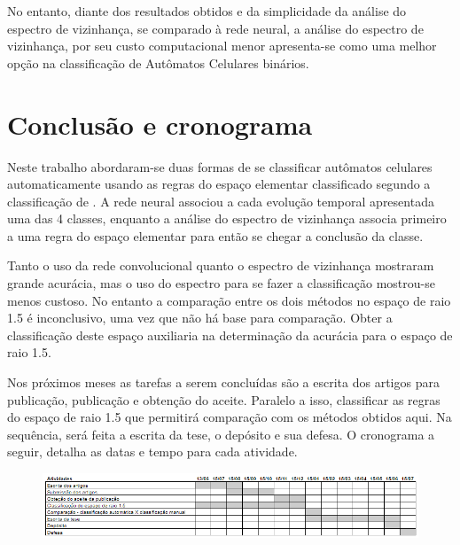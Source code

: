 \documentclass[12pt,a4paper]{report}
\begin{document}
	No entanto, diante dos resultados obtidos e da simplicidade da análise do espectro de vizinhança, se comparado à rede neural, a análise do espectro de vizinhança, por seu custo computacional menor apresenta-se como uma melhor opção na classificação de Autômatos Celulares binários. 
	
	
	\chapter{Conclusão e cronograma}
	\label{cap:conclusaoCronograma}
	
	Neste trabalho abordaram-se duas formas de se classificar autômatos celulares automaticamente usando as regras do espaço elementar classificado segundo a classificação de . A rede neural associou a cada evolução temporal apresentada uma das 4 classes, enquanto a análise do espectro de vizinhança associa primeiro a uma regra do espaço elementar para então se chegar a conclusão da classe.
	
	Tanto o uso da rede convolucional quanto o espectro de vizinhança mostraram grande acurácia, mas o uso do espectro para se fazer a classificação mostrou-se menos custoso. No entanto a comparação entre os dois métodos no espaço de raio 1.5 é inconclusivo, uma vez que não há base para comparação. Obter a classificação deste espaço auxiliaria na determinação da acurácia para o espaço de raio 1.5.
	
	Nos próximos meses as tarefas a serem concluídas são a escrita dos artigos para publicação, publicação e obtenção do aceite. Paralelo a isso, classificar as regras do espaço de raio 1.5 que permitirá comparação com os métodos obtidos aqui. Na sequência, será feita a escrita da tese, o depósito e sua defesa. O cronograma a seguir, detalha as datas e tempo para cada atividade.
	
	\begin{figure}[H]
		\centering
		\includegraphics[scale=0.75]{./img/cronograma.png}
		\label{fig:cronograma}
	\end{figure}
	
	\def\refname{Referências Bibliográficas}
	
	
	
\end{document}
